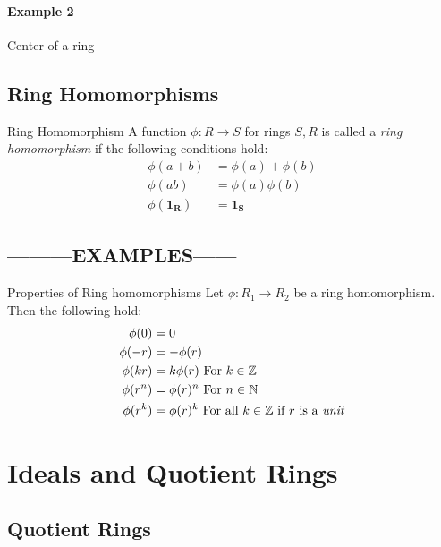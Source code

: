 \documentclass[16pt,a4paper]{article}
\theoremstyle{definition}
\begin{document}
\paragraph{Example 2} Center of a ring 

\subsection{Ring Homomorphisms}

\begin{defn}{Ring Homomorphism}{}
A function $\phi : R\rightarrow S$ for rings $S,R$ is called a \emph{ring homomorphism} if the following conditions hold: 
\begin{align}
\phi(a+b) &= \phi(a) + \phi(b)\\
\phi(ab) &= \phi(a)\phi(b) \\
\phi(\mathbf{1_R}) &= \mathbf{1_S}
\end{align}
\end{defn}

\subsection*{---------EXAMPLES------}

\newpage
\setcounter{equation}{0}

\begin{thm}{Properties of Ring homomorphisms}{}
Let $\phi: R_1 \rightarrow R_2$ be a ring homomorphism. Then the following hold: 
\begin{align}
\phi(0) &= 0 \\
\phi(-r) &= -\phi(r)\\
\phi(kr) &= k\phi(r) \text{ For $k\in \mathbb{Z}$} \\
\phi(r^n) &= \phi(r)^n \text{ For $n\in \mathbb{N}$} \\
\phi(r^k) &= \phi(r)^k \text{ For all $k\in \mathbb{Z}$ if $r$ is a \emph{unit}}
\end{align}


\end{thm}


\section{Ideals and Quotient Rings}

\subsection{Quotient Rings}
\end{document}
